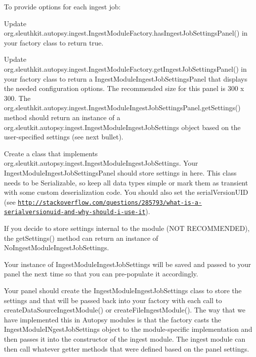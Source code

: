 To provide options for each ingest job\+:
\begin{DoxyItemize}
\item Update org.\+sleuthkit.\+autopsy.\+ingest.\+Ingest\+Module\+Factory.\+has\+Ingest\+Job\+Settings\+Panel() in your factory class to return true.
\item Update org.\+sleuthkit.\+autopsy.\+ingest.\+Ingest\+Module\+Factory.\+get\+Ingest\+Job\+Settings\+Panel() in your factory class to return a Ingest\+Module\+Ingest\+Job\+Settings\+Panel that displays the needed configuration options. The recommended size for this panel is 300 x 300. The org.\+sleuthkit.\+autopsy.\+ingest.\+Ingest\+Module\+Ingest\+Job\+Settings\+Panel.\+get\+Settings() method should return an instance of a org.\+sleutkit.\+autopsy.\+ingest.\+Ingest\+Module\+Ingest\+Job\+Settings object based on the user-\/specified settings (see next bullet).
\item Create a class that implements org.\+sleutkit.\+autopsy.\+ingest.\+Ingest\+Module\+Ingest\+Job\+Settings. Your Ingest\+Module\+Ingest\+Job\+Settings\+Panel should store settings in here. This class needs to be Serializable, so keep all data types simple or mark them as transient with some custom deserialization code. You should also set the serial\+Version\+U\+ID (see \href{http://stackoverflow.com/questions/285793/what-is-a-serialversionuid-and-why-should-i-use-it}{\tt http\+://stackoverflow.\+com/questions/285793/what-\/is-\/a-\/serialversionuid-\/and-\/why-\/should-\/i-\/use-\/it}).
\item If you decide to store settings internal to the module (N\+OT R\+E\+C\+O\+M\+M\+E\+N\+D\+ED), the get\+Settings() method can return an instance of No\+Ingest\+Module\+Ingest\+Job\+Settings.
\item Your instance of Ingest\+Module\+Ingest\+Job\+Settings will be saved and passed to your panel the next time so that you can pre-\/populate it accordingly.
\end{DoxyItemize}

Your panel should create the Ingest\+Module\+Ingest\+Job\+Settings class to store the settings and that will be passed back into your factory with each call to create\+Data\+Source\+Ingest\+Module() or create\+File\+Ingest\+Module(). The way that we have implemented this in Autopsy modules is that the factory casts the Ingest\+Module\+I\+Ngest\+Job\+Settings object to the module-\/specific implementation and then passes it into the constructor of the ingest module. The ingest module can then call whatever getter methods that were defined based on the panel settings.

